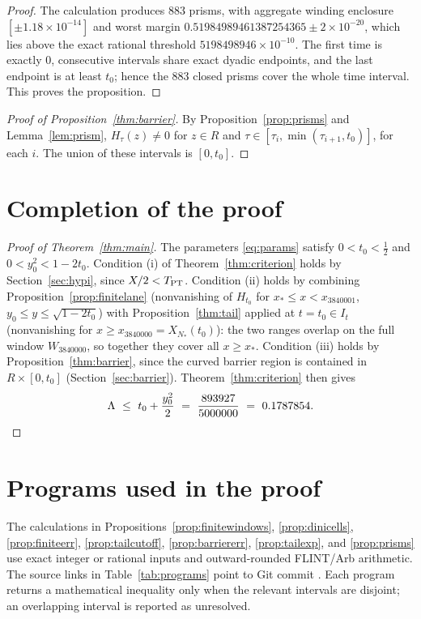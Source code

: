 \documentclass[11pt]{article}
\theoremstyle{definition}
\newcommand{\LB}{\Lambda}
\begin{document}
\begin{proof}
The calculation produces $883$ prisms, with aggregate winding enclosure
$[\pm1.18\times10^{-14}]$ and worst margin
$0.51984989461387254365\pm2\times10^{-20}$, which lies above the
exact rational threshold $5198498946\times10^{-10}$. The first time is
exactly $0$, consecutive intervals share exact dyadic endpoints, and the last
endpoint is at least $t_0$; hence the $883$ closed prisms cover the whole time
interval. This proves the proposition.
\end{proof}

\begin{proof}[Proof of Proposition~\ref{thm:barrier}]
By Proposition~\ref{prop:prisms} and Lemma~\ref{lem:prism},
$H_\tau(z)\neq0$ for $z\in R$ and
$\tau\in[\tau_i,\min(\tau_{i+1},t_0)]$, for each $i$. The union of
these intervals is $[0,t_0]$.
\end{proof}

\section{Completion of the proof}\label{sec:assembly}

\begin{proof}[Proof of Theorem~\ref{thm:main}]
The parameters \eqref{eq:params} satisfy $0<t_0<\frac12$ and
$0<y_0^2<1-2t_0$. Condition (i) of Theorem~\ref{thm:criterion}
holds by Section~\ref{sec:hypi}, since $X/2<T_{\rm PT}$. Condition
(ii) holds by combining Proposition~\ref{prop:finitelane}
(nonvanishing of $H_{t_0}$ for $x_*\le x<x_{3840001}$,
$y_0\le y\le\sqrt{1-2t_0}$) with Proposition~\ref{thm:tail} applied at
$t=t_0\in I_t$ (nonvanishing for $x\ge x_{3840000}=X_{N_*}(t_0)$):
the two ranges overlap on the full window $W_{3840000}$, so together
they cover all $x\ge x_*$. Condition (iii) holds by
Proposition~\ref{thm:barrier}, since the curved barrier region is
contained in $R\times[0,t_0]$
(Section~\ref{sec:barrier}). Theorem~\ref{thm:criterion} then gives
\[
\LB\ \le\ t_0+\frac{y_0^2}{2}\ =\ \frac{893927}{5000000}
\ =\ 0.1787854 . \qedhere
\]
\end{proof}

\appendix
\section{Programs used in the proof}\label{sec:programs}

The calculations in Propositions~\ref{prop:finitewindows}, \ref{prop:dinicells},
\ref{prop:finiteerr}, \ref{prop:tailcutoff}, \ref{prop:barriererr},
\ref{prop:tailexp}, and \ref{prop:prisms} use exact integer or rational
inputs and outward-rounded FLINT/Arb arithmetic.  The source links in
Table~\ref{tab:programs} point to Git commit
\texttt{}.  Each program
returns a mathematical inequality only when the relevant intervals are
disjoint; an overlapping interval is reported as unresolved.
\end{document}

